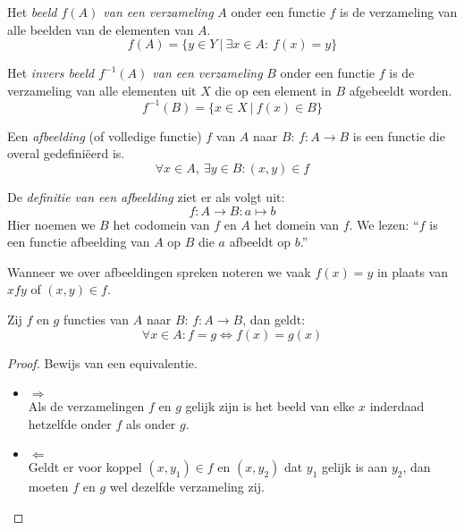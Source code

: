 \documentclass[main.tex]{subfiles}
\begin{document}
\begin{de}
  Het \emph{beeld $f(A)$ van een verzameling} $A$ onder een functie $f$ is de verzameling van alle beelden van de elementen van $A$.
  \[ f(A) = \{ y \in Y \ |\ \exists x \in A:\ f(x) = y \} \]
\end{de}

\begin{de}
  Het \emph{invers beeld $f^{-1}(A)$ van een verzameling} $B$ onder een functie $f$ is de verzameling van alle elementen uit $X$ die op een element in $B$ afgebeeldt worden.
  \[ f^{-1}(B) = \{ x \in X \ |\ f(x) \in B \} \]
\end{de}

\begin{de}
  Een \emph{afbeelding} (of volledige functie) $f$ van $A$ naar $B$: $f: A \rightarrow B$ is een functie die overal gedefini\"eerd is.
  \[ \forall x \in A,\ \exists y \in B: (x,y) \in f \]
\end{de} 
 
\begin{de}
  De \emph{definitie van een afbeelding} ziet er als volgt uit:
  \[ f: A \rightarrow B: a \mapsto b \]
  Hier noemen we $B$ het codomein van $f$ en $A$ het domein van $f$.
  We lezen: ``$f$ is een functie afbeelding van $A$ op $B$ die $a$ afbeeldt op $b$.''
\end{de} 
 
\begin{de}
  Wanneer we over afbeeldingen spreken noteren we vaak $f(x) = y$ in plaats van $x f y$ of $(x,y) \in f$.
\end{de}


\begin{st}
  Zij $f$ en $g$ functies van $A$ naar $B$: $f: A \rightarrow B$, dan geldt:
  \[ \forall x \in A: f = g \Leftrightarrow f(x) = g(x) \]  
  \begin{proof}
    Bewijs van een equivalentie.
    \begin{itemize}
    \item $\Rightarrow$\\
      Als de verzamelingen $f$ en $g$ gelijk zijn is het beeld van elke $x$ inderdaad hetzelfde onder $f$ als onder $g$.
    \item $\Leftarrow$\\
      Geldt er voor koppel $(x,y_{1}) \in f$ en $(x,y_{2})$ dat $y_{1}$ gelijk is aan $y_{2}$, dan moeten $f$ en $g$ wel dezelfde verzameling zij.
    \end{itemize}
  \end{proof}
\end{st}
\end{document}
